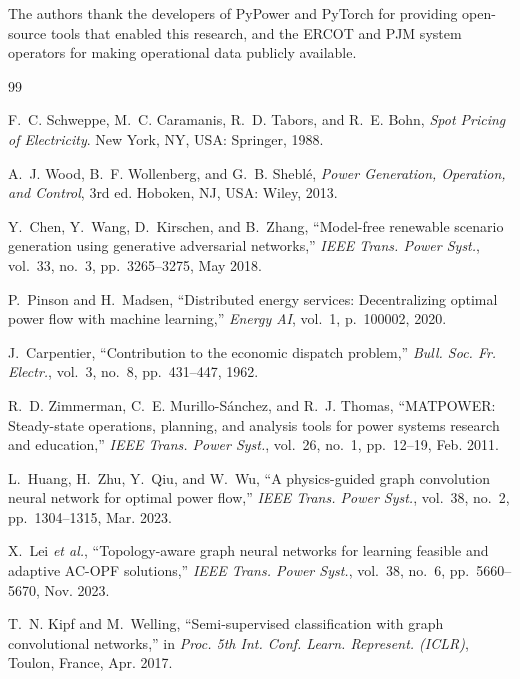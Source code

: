 \documentclass[journal,10pt]{IEEEtran}
\begin{document}
The authors thank the developers of PyPower and PyTorch for providing open-source tools that enabled this research, and the ERCOT and PJM system operators for making operational data publicly available.

\begin{thebibliography}{99}

F.~C. Schweppe, M.~C. Caramanis, R.~D. Tabors, and R.~E. Bohn, \emph{Spot Pricing of Electricity}. New York, NY, USA: Springer, 1988.

A.~J. Wood, B.~F. Wollenberg, and G.~B. Sheblé, \emph{Power Generation, Operation, and Control}, 3rd ed. Hoboken, NJ, USA: Wiley, 2013.

Y.~Chen, Y.~Wang, D.~Kirschen, and B.~Zhang, ``Model-free renewable scenario generation using generative adversarial networks,'' \emph{IEEE Trans. Power Syst.}, vol.~33, no.~3, pp.~3265--3275, May 2018.

P.~Pinson and H.~Madsen, ``Distributed energy services: Decentralizing optimal power flow with machine learning,'' \emph{Energy AI}, vol.~1, p.~100002, 2020.

J.~Carpentier, ``Contribution to the economic dispatch problem,'' \emph{Bull. Soc. Fr. Electr.}, vol.~3, no.~8, pp.~431--447, 1962.

R.~D. Zimmerman, C.~E. Murillo-Sánchez, and R.~J. Thomas, ``MATPOWER: Steady-state operations, planning, and analysis tools for power systems research and education,'' \emph{IEEE Trans. Power Syst.}, vol.~26, no.~1, pp.~12--19, Feb. 2011.

L.~Huang, H.~Zhu, Y.~Qiu, and W.~Wu, ``A physics-guided graph convolution neural network for optimal power flow,'' \emph{IEEE Trans. Power Syst.}, vol.~38, no.~2, pp.~1304--1315, Mar. 2023.

X.~Lei \emph{et al.}, ``Topology-aware graph neural networks for learning feasible and adaptive AC-OPF solutions,'' \emph{IEEE Trans. Power Syst.}, vol.~38, no.~6, pp.~5660--5670, Nov. 2023.

T.~N. Kipf and M.~Welling, ``Semi-supervised classification with graph convolutional networks,'' in \emph{Proc. 5th Int. Conf. Learn. Represent. (ICLR)}, Toulon, France, Apr. 2017.


\end{thebibliography}
\end{document}
